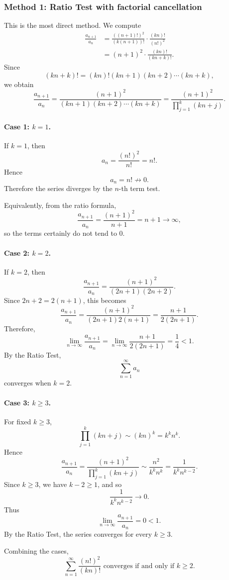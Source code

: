 \documentclass[12pt]{article}
\begin{document}
\subsubsection*{Method 1: Ratio Test with factorial cancellation}

This is the most direct method. We compute
\begin{align*}
\frac{a_{n+1}}{a_n}
&=
\frac{((n+1)!)^2}{(k(n+1))!}
\cdot
\frac{(kn)!}{(n!)^2} \\
&=
(n+1)^2\cdot \frac{(kn)!}{(kn+k)!}.
\end{align*}
Since
\[
(kn+k)!=(kn)!(kn+1)(kn+2)\cdots(kn+k),
\]
we obtain
\[
\frac{a_{n+1}}{a_n}
=
\frac{(n+1)^2}{(kn+1)(kn+2)\cdots(kn+k)}
=
\frac{(n+1)^2}{\prod_{j=1}^{k}(kn+j)}.
\]

\paragraph{Case 1: \(k=1\).}
If \(k=1\), then
\[
a_n=\frac{(n!)^2}{n!}=n!.
\]
Hence
\[
a_n=n!\not\to 0.
\]
Therefore the series diverges by the \(n\)-th term test.

Equivalently, from the ratio formula,
\[
\frac{a_{n+1}}{a_n}
=
\frac{(n+1)^2}{n+1}
=
n+1\to\infty,
\]
so the terms certainly do not tend to \(0\).

\newpage
\paragraph{Case 2: \(k=2\).}
If \(k=2\), then
\[
\frac{a_{n+1}}{a_n}
=
\frac{(n+1)^2}{(2n+1)(2n+2)}.
\]
Since \(2n+2=2(n+1)\), this becomes
\[
\frac{a_{n+1}}{a_n}
=
\frac{(n+1)^2}{(2n+1)2(n+1)}
=
\frac{n+1}{2(2n+1)}.
\]
Therefore,
\[
\lim_{n\to\infty}\frac{a_{n+1}}{a_n}
=
\lim_{n\to\infty}\frac{n+1}{2(2n+1)}
=
\frac14<1.
\]
By the Ratio Test,
\[
\sum_{n=1}^{\infty}a_n
\]
converges when \(k=2\).

\paragraph{Case 3: \(k\ge 3\).}
For fixed \(k\ge 3\),
\[
\prod_{j=1}^{k}(kn+j)
\sim
(kn)^k
=
k^k n^k.
\]
Hence
\[
\frac{a_{n+1}}{a_n}
=
\frac{(n+1)^2}{\prod_{j=1}^{k}(kn+j)}
\sim
\frac{n^2}{k^k n^k}
=
\frac{1}{k^k n^{k-2}}.
\]
Since \(k\ge 3\), we have \(k-2\ge 1\), and so
\[
\frac{1}{k^k n^{k-2}}\to 0.
\]
Thus
\[
\lim_{n\to\infty}\frac{a_{n+1}}{a_n}=0<1.
\]
By the Ratio Test, the series converges for every \(k\ge 3\).

Combining the cases,
\[
\boxed{\sum_{n=1}^{\infty}\frac{(n!)^2}{(kn)!}
\text{ converges if and only if }k\ge 2.}
\]
\end{document}
